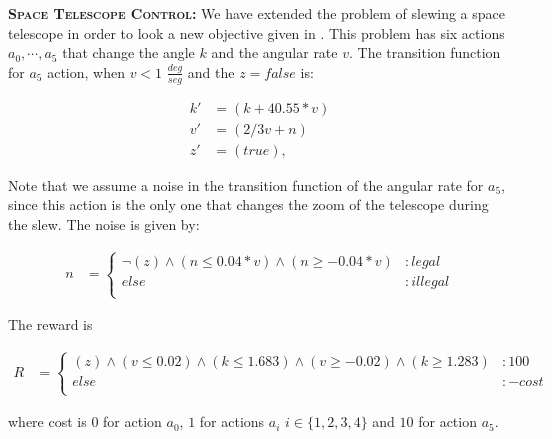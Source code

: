 
{\bf \textsc{Space Telescope Control}:} We have extended the problem of slewing a space telescope
in order to look a new objective given in \cite{DLohr:2012}. This problem has six actions $a_0, \cdots ,a_5$ that change the angle $k$ and the angular rate $v$. The transition function for $a_5$ action, when $v < 1$ $\frac{deg}{seg}$ and the $z= false$ is:

{\footnotesize
\begin{align*}
k' & =( k + 40.55*v) \\
v'& =(2/3 v + n) \\
z'& =( true ),
\end{align*}}

Note that we assume a noise in the transition function of the angular rate for $a_5$, since this action is the only one that changes the zoom of the telescope during the slew. The noise is given by:

{\footnotesize
\begin{align*}
n & = \begin{cases}
\neg (z) \wedge (n \leq 0.04*v) \wedge (n \geq -0.04*v) &:legal\\
else &: illegal\\
\end{cases}
\end{align*}}

The reward is

{\tiny
\begin{align*}
R & = \begin{cases}
(z) \wedge (v \leq 0.02) \wedge (k \leq 1.683) \wedge (v \geq -0.02) \wedge (k \geq 1.283) &:100\\
else &: -cost\\
\end{cases}
\end{align*}}

where cost is 0 for action $a_0$, $1$ for actions $a_i$ $i \in \{1,2,3,4\}$ and $10$ for action $a_5$.

